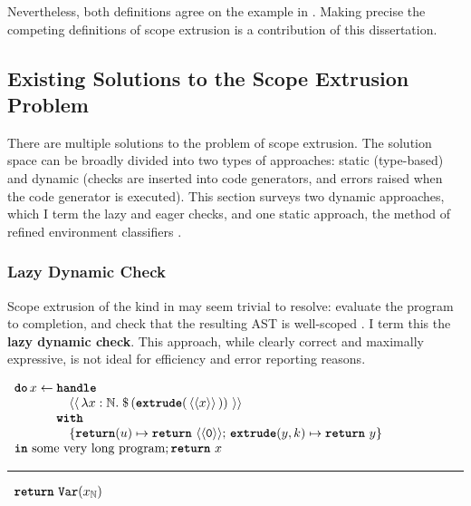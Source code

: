 Nevertheless, both definitions agree on the example in . Making precise the competing definitions of scope extrusion is a contribution of this dissertation. 

\subsection{Existing Solutions to the Scope Extrusion Problem}
There are multiple solutions to the problem of scope extrusion. The solution space can be broadly divided into two types of approaches: static (type-based) and dynamic (checks are inserted into code generators, and errors raised when the code generator is executed). This section surveys two dynamic approaches, which I term the lazy and eager checks, and one static approach, the method of refined environment classifiers \citep{kiselyov-16,isoda-24}. 

\subsubsection{Lazy Dynamic Check}\label{subsubsection:lazy-dynamic-check}
Scope extrusion of the kind in  may seem trivial to resolve: evaluate the program to completion, and check that the resulting AST is well-scoped \citep{kiselyov-14}. I term this the \textbf{lazy dynamic check}. This approach, while clearly correct and maximally expressive, is not ideal for efficiency and error reporting reasons. 

\begin{code}
  \begin{efflst}
    $\begin{array}{l}
      \textbf{\texttt{do}} \,  x \leftarrow \textbf{\texttt{handle}} \\
      \quad \quad \quad \quad \,\, \equote[\, {\lambda x:\mathbb{N}.\; \splice[\, {(\textbf{\texttt{extrude}}(\, \equote[x] \, ))}\, ]} \, ] \\
      \quad \quad \quad \,\, \textbf{\texttt{with}} \\
      \quad \quad \quad \quad \, \, \{ \textbf{\texttt{return}}(u) \mapsto {\return{\equote[\texttt{0}]}}; \, \textbf{\texttt{extrude}}(y, k) \mapsto {\return{y}}\}\\
      \textbf{\texttt{in}} \text{ some very long program}; \return{x}
    \end{array}$

    \vspace{2mm} 
\textcolor{effComment}{\hrule height 0.2mm \relax}
\vspace{2mm} 

\textcolor{effComment}{$\begin{array}{l}\return{\Var{x}{\mathbb{N}}}\end{array}$}

\end{efflst}
%
\label{listing:efflang-lazy-scope-extrusion-inefficient}
\end{code}

